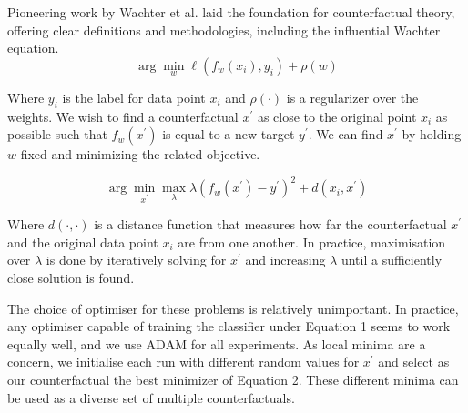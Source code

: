 
Pioneering work by Wachter et al. \cite{wachter_counterfactual_2018} laid the foundation for counterfactual theory, offering clear definitions and methodologies, including the influential Wachter equation.
\begin{equation} \label{eq:1}
\arg \min _{w} \ell\left(f_{w}\left(x_{i}\right), y_{i}\right)+\rho(w)
\end{equation}

Where $y_{i}$ is the label for data point $x_{i}$ and $\rho(\cdot)$ is a regularizer over the weights. We wish to find a counterfactual $x^{\prime}$ as close to the original point $x_{i}$ as possible such that $f_{w}\left(x^{\prime}\right)$ is equal to a new target $y^{\prime}$. We can find $x^{\prime}$ by holding $w$ fixed and minimizing the related objective.


\begin{equation} \label{eq:2}
\arg \min _{x^{\prime}} \max _{\lambda} \lambda\left(f_{w}\left(x^{\prime}\right)-y^{\prime}\right)^{2}+d\left(x_{i}, x^{\prime}\right)
\end{equation}

Where $d(\cdot, \cdot)$ is a distance function that measures how far the counterfactual $x^{\prime}$ and the original data point $x_{i}$ are from one another. In practice, maximisation over $\lambda$ is done by iteratively solving for $x^{\prime}$ and increasing $\lambda$ until a sufficiently close solution is found.

The choice of optimiser for these problems is relatively unimportant. In practice, any optimiser capable of training the classifier under Equation 1 seems to work equally well, and we use $\mathrm{ADAM}$ \cite{kingma_adam_2017} for all experiments.
As local minima are a concern, we initialise each run with different random values for $x^{\prime}$ and select as our counterfactual the best minimizer of Equation 2. These different minima can be used as a diverse set of multiple counterfactuals.
